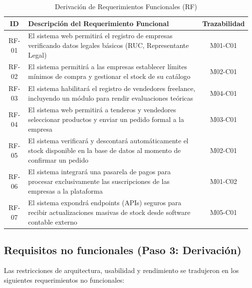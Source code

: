 \documentclass[12pt,a4paper]{article}
\begin{document}
\begin{table}[H]
    \centering
    \begin{tabularx}{\textwidth}{|c|X|c|}
        \hline
        \textbf{ID} & \textbf{Descripción del Requerimiento Funcional} & \textbf{Trazabilidad} \\ \hline
        RF-01 & El sistema web permitirá el registro de empresas verificando datos legales básicos (RUC, Representante Legal) & M01-C01 \\ \hline
        RF-02 & El sistema permitirá a las empresas establecer límites mínimos de compra y gestionar el stock de su catálogo & M02-C01 \\ \hline
        RF-03 & El sistema habilitará el registro de vendedores freelance, incluyendo un módulo para rendir evaluaciones teóricas & M04-C01 \\ \hline
        RF-04 & El sistema web permitirá a tenderos y vendedores seleccionar productos y enviar un pedido formal a la empresa & M03-C01 \\ \hline
        RF-05 & El sistema verificará y descontará automáticamente el stock disponible en la base de datos al momento de confirmar un pedido & M02-C01 \\ \hline
        RF-06 & El sistema integrará una pasarela de pagos para procesar exclusivamente las suscripciones de las empresas a la plataforma & M01-C02 \\ \hline
        RF-07 & El sistema expondrá endpoints (APIs) seguros para recibir actualizaciones masivas de stock desde software contable externo & M05-C01 \\ \hline
    \end{tabularx}
    \caption{Derivación de Requerimientos Funcionales (RF)}
\end{table}

\subsection{Requisitos no funcionales (Paso 3: Derivación)}
Las restricciones de arquitectura, usabilidad y rendimiento se tradujeron en los siguientes requerimientos no funcionales:
\end{document}
